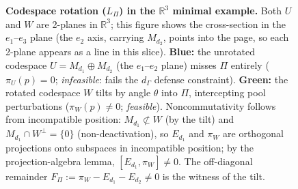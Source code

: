 \documentclass[11pt]{article}
\theoremstyle{remark}
\begin{document}
\begin{figure}[ht]
\caption[Codespace rotation in the $\mathbb{R}^3$ minimal example]{%
\textbf{Codespace rotation ($L_\Pi$) in the $\mathbb{R}^3$ minimal example.}
Both $U$ and $W$ are 2-planes in $\mathbb{R}^3$; this figure shows the cross-section in the $e_1$--$e_3$ plane (the $e_2$ axis, carrying $M_{d_2}$, points into the page, so each 2-plane appears as a line in this slice).
\textbf{Blue:} the unrotated codespace $U = M_{d_1} \oplus M_{d_2}$ (the $e_1$--$e_2$ plane) misses $\Pi$ entirely ($\pi_U(p) = 0$; \emph{infeasible}: fails the $d_\Gamma$ defense constraint).
\textbf{Green:} the rotated codespace $W$ tilts by angle $\theta$ into $\Pi$, intercepting pool perturbations ($\pi_W(p) \ne 0$; \emph{feasible}).
Noncommutativity follows from incompatible position: $M_{d_1} \not\subset W$ (by the tilt) and $M_{d_1} \cap W^\perp = \{0\}$ (non-deactivation), so $E_{d_1}$ and $\pi_W$ are orthogonal projections onto subspaces in incompatible position; by the projection-algebra lemma, $[E_{d_1}, \pi_W] \ne 0$.
The off-diagonal remainder $F_\Pi := \pi_W - E_{d_1} - E_{d_2} \ne 0$ is the witness of the tilt.
}
\label{fig:codespace_rotation}
\end{figure}
\end{document}
